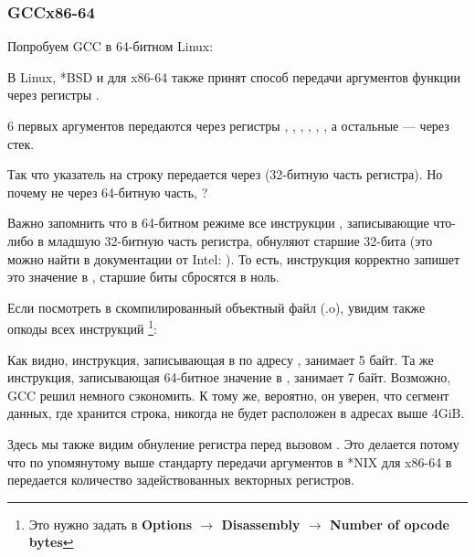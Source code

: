 \subsubsection{GCC\EMDASH{}x86-64}

Попробуем GCC в 64-битном Linux:



В Linux, *BSD и \MacOSX для x86-64 также принят способ передачи аргументов функции через регистры \SysVABI.

6 первых аргументов передаются через регистры \RDI, \RSI, \RDX, \RCX, , , а остальные --- через стек.

Так что указатель на строку передается через \EDI (32-битную часть регистра).
Но почему не через 64-битную часть, \RDI?

Важно запомнить что в 64-битном режиме все инструкции \MOV, записывающие что-либо в младшую 32-битную часть регистра, обнуляют старшие 32-бита (это можно найти в документации от Intel: ).
То есть, инструкция  корректно запишет это значение в \RAX, старшие биты сбросятся в ноль.

Если посмотреть в \IDA скомпилированный объектный файл (.o), увидим также опкоды всех инструкций
\footnote{Это нужно задать в \textbf{Options $\rightarrow$ Disassembly $\rightarrow$ Number of opcode bytes}}:



\label{hw_EDI_instead_of_RDI}
Как видно, инструкция, записывающая в \EDI по адресу , занимает 5 байт.
Та же инструкция, записывающая 64-битное значение в \RDI, занимает 7 байт.
Возможно, GCC решил немного сэкономить.
К тому же, вероятно, он уверен, что сегмент данных, где хранится строка, никогда не будет расположен в адресах выше 4\gls{GiB}.

\label{SysVABI_input_EAX}
Здесь мы также видим обнуление регистра \EAX перед вызовом \printf.
Это делается потому что по упомянутому выше стандарту передачи аргументов в *NIX для x86-64 в \EAX передается количество задействованных векторных регистров.


